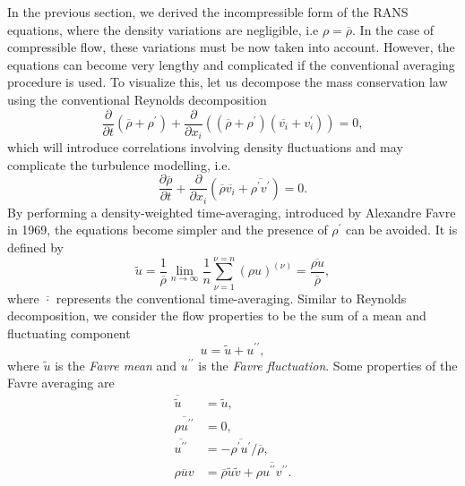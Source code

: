 In the previous section, we derived the incompressible form of the RANS equations, where the density variations are negligible, i.e $\rho=\overline{\rho}$. In the case of compressible flow, these variations must be now taken into account. However, the equations can become very lengthy and complicated if the conventional averaging procedure is used. To visualize this, let us decompose the mass conservation law using the conventional Reynolds decomposition
\begin{equation}
    \frac{\partial}{\partial t} \left(\overline{\rho} + \rho^\prime\right) + \frac{\partial }{\partial x_i} \left(\left(\overline{\rho}+\rho^\prime\right)\left(\overline{v_i}+v_i^\prime\right)\right) = 0,
\end{equation}
which will introduce correlations involving density fluctuations and may complicate the turbulence modelling, i.e.
\begin{equation}
    \frac{\partial \overline{\rho}}{\partial t}  + \frac{\partial }{\partial x_i} \left(\overline \rho \overline{v_i} + \overline{\rho^\prime v^\prime}\right) = 0.
\end{equation}
By performing a density-weighted time-averaging, introduced by Alexandre Favre in 1969, the equations become simpler and the presence of $\rho^\prime$ can be avoided. It is defined by
\begin{equation}
    \tilde{u}=  \frac{1}{\overline{\rho}} \lim_{n\rightarrow\infty} \frac{1}{n}\sum_{\nu=1}^{\nu=n}\left(\rho u\right)^{(\nu)} = \frac{\overline{\rho u}}{\overline{\rho}},
    \label{eqn:favre_definition}
\end{equation}
where $\overline{\cdot}$ represents the conventional time-averaging. Similar to Reynolds decomposition, we consider the flow properties to be the sum of a mean and fluctuating component
\begin{equation}
    u = \tilde{u} + u^{\prime\prime},
\end{equation}
where $\tilde{u}$ is the \textit{Favre mean} and $u^{\prime\prime}$ is the \textit{Favre fluctuation}. Some properties of the Favre averaging are
\begin{align}
    \overline{\tilde{u}} &= \tilde{u},\\
    \overline{\rho u^{\prime\prime}} &= 0, \\
    \overline{u^{\prime\prime}} &= -\overline{\rho^\prime u^\prime}/{\overline{\rho}}, \\ 
    \overline{\rho u v} &= \overline{\rho}\tilde u\tilde v + \overline{\rho u^{\prime\prime}v^{\prime\prime}}. \label{eqn:favre_rhouv}
\end{align}
